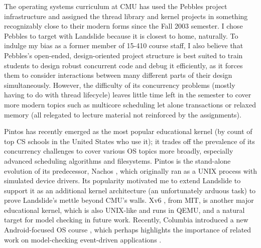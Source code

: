 The operating systems curriculum at CMU has used the Pebbles project infrastructure
and assigned the thread library \cite{thrlib} and kernel \cite{kspec} projects
in something recognizably close to their modern forms since the Fall 2003 semester.
I chose Pebbles to target with Landslide because it is closest to home, naturally.
To indulge my bias as a former member of 15-410 course staff,
I also believe that Pebbles's open-ended, design-oriented project structure is best suited
to train students to design robust concurrent code and debug it efficiently,
as it forces them to consider interactions between many different parts of their design simultaneously.
However, the difficulty of its concurrency problems (mostly having to do with thread lifecycle)
leaves little time left in the semester to cover more modern topics
such as multicore scheduling let alone transactions or relaxed memory
(all relegated to lecture material not reinforced by the assignments).

Pintos \cite{pintos} has recently emerged as the most popular educational kernel
(by count of top CS schools in the United States who use it);
it trades off the prevalence of its concurrency challenges to cover various OS topics more broadly,
especially advanced scheduling algorithms and filesystems.
Pintos is the stand-alone evolution of its predecessor, Nachos \cite{nachos},
which originally ran as a UNIX process with simulated device drivers.
Its popularity motivated me to extend Landslide to support it as an additional kernel architecture
(an unfortunately arduous task)
to prove Landslide's mettle beyond CMU's walls.
Xv6 \cite{xv6}, from MIT, is another major educational kernel, which is also UNIX-like and runs in QEMU,
and a natural target for model checking in future work.
Recently, Columbia introduced a new Android-focused OS course \cite{teaching-android},
which perhaps highlights the importance of related work on model-checking event-driven applications \cite{r4}.

